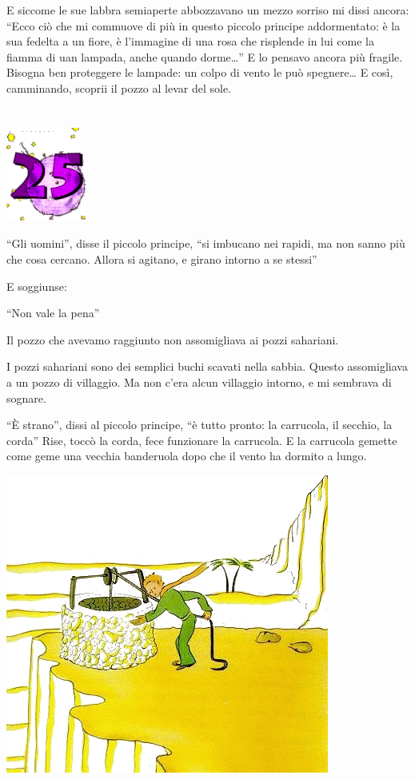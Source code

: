 \documentclass[11pt]{scrbook}
\begin{document}
E siccome le sue labbra semiaperte abbozzavano un mezzo sorriso mi dissi ancora: ``Ecco ciò che mi commuove di più in questo piccolo principe addormentato: è la sua fedelta a un fiore, è l'immagine di una rosa che risplende in lui come la fiamma di uan lampada, anche quando dorme\ldots{}'' E lo pensavo ancora più fragile. Bisogna ben proteggere le lampade: un colpo di vento le può spegnere\ldots{} E così, camminando, scoprii il pozzo al levar del sole.

\chapter{}
\begin{center}
\includegraphics{img/chapter25}
\end{center}

``Gli uomini'', disse il piccolo principe, ``si imbucano nei rapidi, ma non sanno più che cosa cercano. Allora si agitano, e girano intorno a se stessi''

E soggiunse:

``Non vale la pena''

Il pozzo che avevamo raggiunto non assomigliava ai pozzi sahariani.

I pozzi sahariani sono dei semplici buchi scavati nella sabbia. Questo assomigliava a un pozzo di villaggio. Ma non c'era alcun villaggio intorno, e mi sembrava di sognare.

``È strano'', dissi al piccolo principe, ``è tutto pronto: la carrucola, il secchio, la corda'' Rise, toccò la corda, fece funzionare la carrucola. E la carrucola gemette come geme una vecchia banderuola dopo che il vento ha dormito a lungo.

\begin{center}
\includegraphics{img/25a}
\end{center}
\end{document}
